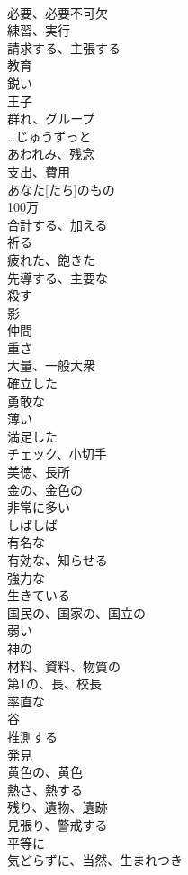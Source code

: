 \documentclass[8pt]{extreport}
\begin{document}
\begin{CJK}{UTF8}{min}
\\	必要、必要不可欠
\\	練習、実行
\\	請求する、主張する
\\	教育
\\	鋭い
\\	王子
\\	群れ、グループ
\\	…じゅうずっと
\\	あわれみ、残念
\\	支出、費用
\\	あなた[たち]のもの
\\	100万
\\	合計する、加える
\\	祈る
\\	疲れた、飽きた
\\	先導する、主要な
\\	殺す
\\	影
\\	仲間
\\	重さ
\\	大量、一般大衆
\\	確立した
\\	勇敢な
\\	薄い
\\	満足した
\\	チェック、小切手
\\	美徳、長所
\\	金の、金色の
\\	非常に多い
\\	しばしば
\\	有名な
\\	有効な、知らせる
\\	強力な
\\	生きている
\\	国民の、国家の、国立の
\\	弱い
\\	神の
\\	材料、資料、物質の
\\	第1の、長、校長
\\	率直な
\\	谷
\\	推測する
\\	発見
\\	黄色の、黄色
\\	熱さ、熱する
\\	残り、遺物、遺跡
\\	見張り、警戒する
\\	平等に
\\	気どらずに、当然、生まれつき

\end{CJK}
\end{document}
